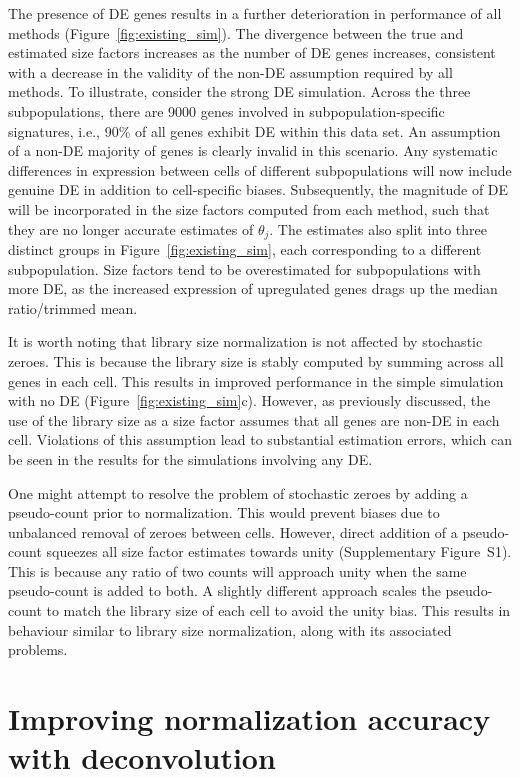 \documentclass{bmcart}
\newcommand{\supppseudo}{S1}
\begin{document}
The presence of DE genes results in a further deterioration in performance of all methods (Figure~\ref{fig:existing_sim}).
The divergence between the true and estimated size factors increases as the number of DE genes increases,
    consistent with a decrease in the validity of the non-DE assumption required by all methods.
To illustrate, consider the strong DE simulation.
Across the three subpopulations, there are 9000 genes involved in subpopulation-specific signatures, i.e., 90\% of all genes exhibit DE within this data set.
An assumption of a non-DE majority of genes is clearly invalid in this scenario.
Any systematic differences in expression between cells of different subpopulations will now include genuine DE in addition to cell-specific biases.
Subsequently, the magnitude of DE will be incorporated in the size factors computed from each method, such that they are no longer accurate estimates of $\theta_j$.
The estimates also split into three distinct groups in Figure~\ref{fig:existing_sim}, each corresponding to a different subpopulation.
Size factors tend to be overestimated for subpopulations with more DE, as the increased expression of upregulated genes drags up the median ratio/trimmed mean.

It is worth noting that library size normalization is not affected by stochastic zeroes.
This is because the library size is stably computed by summing across all genes in each cell.
This results in improved performance in the simple simulation with no DE (Figure~\ref{fig:existing_sim}c).
However, as previously discussed, the use of the library size as a size factor assumes that all genes are non-DE in each cell.
Violations of this assumption lead to substantial estimation errors, which can be seen in the results for the simulations involving any DE.

One might attempt to resolve the problem of stochastic zeroes by adding a pseudo-count prior to normalization.
This would prevent biases due to unbalanced removal of zeroes between cells.
However, direct addition of a pseudo-count squeezes all size factor estimates towards unity (Supplementary Figure~\supppseudo{}).
This is because any ratio of two counts will approach unity when the same pseudo-count is added to both.
A slightly different approach scales the pseudo-count to match the library size of each cell to avoid the unity bias.
This results in behaviour similar to library size normalization, along with its associated problems.

\section*{Improving normalization accuracy with deconvolution}
\end{document}
